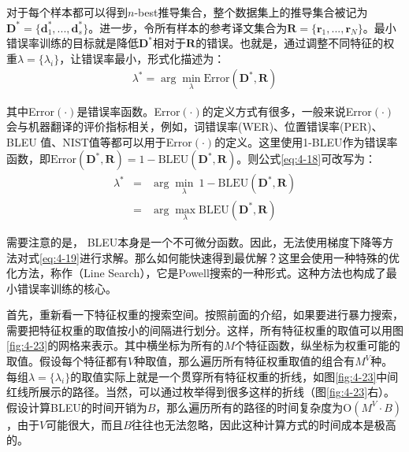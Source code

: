\parinterval 对于每个样本都可以得到$n$-best推导集合，整个数据集上的推导集合被记为$\mathbf{D}^{\ast} = \{\mathbf{d}_{1}^{\ast},...,\mathbf{d}_{s}^{\ast}\}$。进一步，令所有样本的参考译文集合为$\mathbf{R} = \{\mathbf{r}_1,...,\mathbf{r}_N\}$。最小错误率训练的目标就是降低$\mathbf{D}^{\ast}$相对于$\mathbf{R}$的错误。也就是，通过调整不同特征的权重$\lambda = \{ \lambda_i \}$，让错误率最小，形式化描述为：
\begin{eqnarray}
\lambda^{\ast} = \arg\min_{\lambda} \textrm{Error}(\mathbf{D}^{\ast},\mathbf{R})
\label{eq:4-18}
\end{eqnarray}

\noindent 其中\textrm{Error}$(\cdot)$是错误率函数。\textrm{Error}$(\cdot)$的定义方式有很多，一般来说\textrm{Error}$(\cdot)$会与机器翻译的评价指标相关，例如，词错误率(WER)、位置错误率(PER)、BLEU 值、NIST值等都可以用于\textrm{Error}$(\cdot)$的定义。这里使用1-BLEU作为错误率函数，即$\textrm{Error}(\mathbf{D}^{\ast},\mathbf{R}) = 1 - \textrm{BLEU}(\mathbf{D}^{\ast},\mathbf{R})$。则公式\ref{eq:4-18}可改写为：
\begin{eqnarray}
\lambda^{\ast} &=& \arg\min_{\lambda}\ 1 - \textrm{BLEU}(\mathbf{D}^{\ast},\mathbf{R})   \nonumber \\
&=& \arg\max_{\lambda} \textrm{BLEU}(\mathbf{D}^{\ast},\mathbf{R})
\label{eq:4-19}
\end{eqnarray}

\parinterval 需要注意的是， BLEU本身是一个不可微分函数。因此，无法使用梯度下降等方法对式\ref{eq:4-19}进行求解。那么如何能快速得到最优解？这里会使用一种特殊的优化方法，称作{\small{}}（Line Search），它是Powell搜索的一种形式\cite{powell1964an}。这种方法也构成了最小错误率训练的核心。

\parinterval 首先，重新看一下特征权重的搜索空间。按照前面的介绍，如果要进行暴力搜索，需要把特征权重的取值按小的间隔进行划分。这样，所有特征权重的取值可以用图\ref{fig:4-23}的网格来表示。其中横坐标为所有的$M$个特征函数，纵坐标为权重可能的取值。假设每个特征都有$V$种取值，那么遍历所有特征权重取值的组合有$M^V$种。每组$\lambda = \{\lambda_i\}$的取值实际上就是一个贯穿所有特征权重的折线，如图\ref{fig:4-23}中间红线所展示的路径。当然，可以通过枚举得到很多这样的折线（图\ref{fig:4-23}右）。假设计算BLEU的时间开销为$B$，那么遍历所有的路径的时间复杂度为$\textrm{O}(M^V \cdot B)$，由于$V$可能很大，而且$B$往往也无法忽略，因此这种计算方式的时间成本是极高的。

